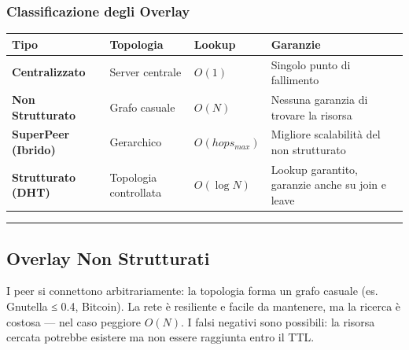 \documentclass[
  italian,
  openany]{book}
\newcounter{none} %
\begin{document}
\subsubsection{Classificazione degli
Overlay}\label{classificazione-degli-overlay}

{\def\LTcaptype{none} %
\begin{longtable}[]{@{}
  >{\raggedright\arraybackslash}p{}
  >{\raggedright\arraybackslash}p{}
  >{\raggedright\arraybackslash}p{}
  >{\raggedright\arraybackslash}p{}@{}}
\toprule\noalign{}
\begin{minipage}[b]{\linewidth}\raggedright
Tipo
\end{minipage} & \begin{minipage}[b]{\linewidth}\raggedright
Topologia
\end{minipage} & \begin{minipage}[b]{\linewidth}\raggedright
Lookup
\end{minipage} & \begin{minipage}[b]{\linewidth}\raggedright
Garanzie
\end{minipage} \\
\midrule\noalign{}
\endhead
\bottomrule\noalign{}
\endlastfoot
\textbf{Centralizzato} & Server centrale & \(O(1)\) & Singolo punto di
fallimento \\
\textbf{Non Strutturato} & Grafo casuale & \(O(N)\) & Nessuna garanzia
di trovare la risorsa \\
\textbf{SuperPeer (Ibrido)} & Gerarchico & \(O(hops_{max})\) & Migliore
scalabilità del non strutturato \\
\textbf{Strutturato (DHT)} & Topologia controllata & \(O(\log N)\) &
Lookup garantito, garanzie anche su join e leave \\
\end{longtable}
}

\begin{center}\rule{0.5\linewidth}{0.5pt}\end{center}

\subsection{Overlay Non Strutturati}\label{overlay-non-strutturati}

I peer si connettono arbitrariamente: la topologia forma un grafo
casuale (es. Gnutella ≤ 0.4, Bitcoin). La rete è resiliente e facile da
mantenere, ma la ricerca è costosa --- nel caso peggiore \(O(N)\). I
falsi negativi sono possibili: la risorsa cercata potrebbe esistere ma
non essere raggiunta entro il TTL.
\end{document}
